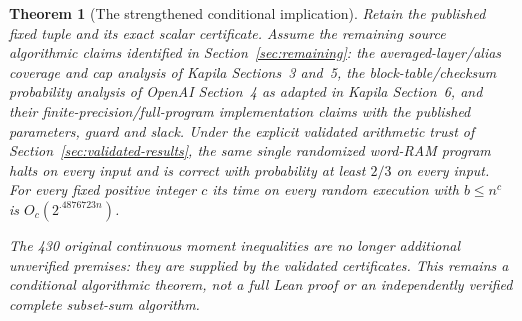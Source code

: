 \documentclass[11pt]{article}
\newtheorem{theorem}{Theorem}
\begin{document}
\begin{theorem}[The strengthened conditional implication]\label{thm:strengthened}
Retain the published fixed tuple and its exact scalar certificate.
Assume the remaining source algorithmic claims identified in
Section~\ref{sec:remaining}: the averaged-layer/alias coverage and
cap analysis of Kapila Sections~3 and~5, the block-table/checksum
probability analysis of OpenAI Section~4 as adapted in Kapila Section~6,
and their finite-precision/full-program implementation claims with the
published parameters, guard and slack. Under the explicit validated
arithmetic trust of Section~\ref{sec:validated-results}, the same single
randomized word-RAM program halts on every input and is correct with
probability at least $2/3$ on every input. For every fixed positive
integer $c$ its time on every random execution with $b\le n^c$ is
$O_c(2^{.4876723n})$.

The 430 original continuous moment inequalities are no longer additional
unverified premises: they are supplied by the validated certificates.
This remains a conditional algorithmic theorem, not a full Lean proof
or an independently verified complete subset-sum algorithm.
\end{theorem}
\end{document}
